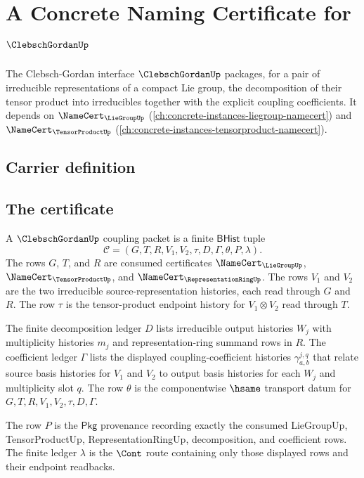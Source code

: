 \chapter{A Concrete Naming Certificate for $\ClebschGordanUp$}
\label{ch:concrete-instances-clebschgordan-namecert}

The Clebsch-Gordan interface $\ClebschGordanUp$ packages, for a pair of irreducible representations of a compact Lie group, the decomposition of their tensor product into irreducibles together with the explicit coupling coefficients. It depends on $\NameCert_{\LieGroupUp}$ (\autoref{ch:concrete-instances-liegroup-namecert}) and $\NameCert_{\TensorProductUp}$ (\autoref{ch:concrete-instances-tensorproduct-namecert}).

\section{Carrier definition}
\label{sec:clebschgordan-carrier}

\section{The certificate}
\label{sec:clebschgordan-certificate}

\begin{definition}
\label{def:clebschgordan-bhist-coupling-packet}
A $\ClebschGordanUp$ coupling packet is a finite $\mathsf{BHist}$ tuple
$$
\mathcal{C}=(G,T,R,V_{1},V_{2},\tau,D,\Gamma,\theta,P,\lambda).
$$
The rows $G$, $T$, and $R$ are consumed certificates
$\NameCert_{\LieGroupUp}$, $\NameCert_{\TensorProductUp}$, and
$\NameCert_{\RepresentationRingUp}$. The rows $V_{1}$ and $V_{2}$ are the two
irreducible source-representation histories, each read through $G$ and $R$.
The row $\tau$ is the tensor-product endpoint history for
$V_{1}\otimes V_{2}$ read through $T$.

The finite decomposition ledger $D$ lists irreducible output histories
$W_{j}$ with multiplicity histories $m_{j}$ and representation-ring
summand rows in $R$. The coefficient ledger $\Gamma$ lists the displayed
coupling-coefficient histories $\gamma_{a,b}^{j,q}$ that relate source basis
histories for $V_{1}$ and $V_{2}$ to output basis histories for each
$W_{j}$ and multiplicity slot $q$. The row $\theta$ is the componentwise
$\hsame$ transport datum for $G,T,R,V_{1},V_{2},\tau,D,\Gamma$.

The row $P$ is the $\mathsf{Pkg}$ provenance recording exactly the consumed
LieGroupUp, TensorProductUp, RepresentationRingUp, decomposition, and
coefficient rows. The finite ledger $\lambda$ is the $\Cont$ route containing
only those displayed rows and their endpoint readbacks.
\end{definition}

